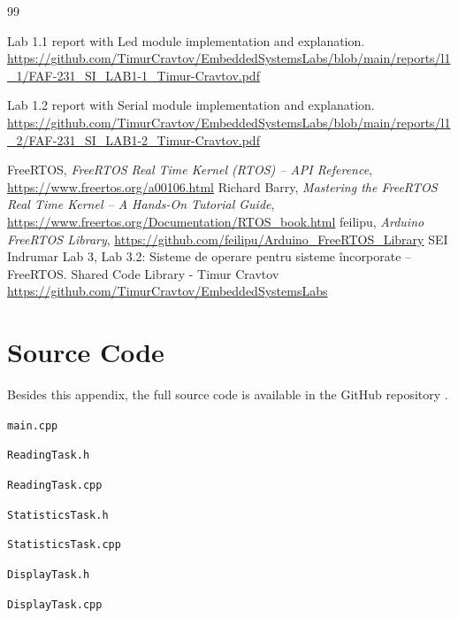 
\begin{thebibliography}{99}

 Lab 1.1 report with Led module implementation and explanation. \url{https://github.com/TimurCravtov/EmbeddedSystemsLabs/blob/main/reports/l1_1/FAF-231_SI_LAB1-1_Timur-Cravtov.pdf}

 Lab 1.2 report with Serial module implementation and explanation. \url{https://github.com/TimurCravtov/EmbeddedSystemsLabs/blob/main/reports/l1_2/FAF-231_SI_LAB1-2_Timur-Cravtov.pdf}

 FreeRTOS, \textit{FreeRTOS Real Time Kernel (RTOS) -- API Reference}, \url{https://www.freertos.org/a00106.html}
 Richard Barry, \textit{Mastering the FreeRTOS Real Time Kernel -- A Hands-On Tutorial Guide}, \url{https://www.freertos.org/Documentation/RTOS_book.html}
 feilipu, \textit{Arduino FreeRTOS Library}, \url{https://github.com/feilipu/Arduino_FreeRTOS_Library}
 SEI Indrumar Lab 3, Lab 3.2: Sisteme de operare pentru sisteme încorporate -- FreeRTOS.
 Shared Code Library - Timur Cravtov \url{https://github.com/TimurCravtov/EmbeddedSystemsLabs}
\end{thebibliography}

\appendix

\section{Source Code}

Besides this appendix, the full source code is available in the GitHub repository \cite{github}.

\texttt{main.cpp}


\texttt{ReadingTask.h}


\texttt{ReadingTask.cpp}


\texttt{StatisticsTask.h}


\texttt{StatisticsTask.cpp}


\texttt{DisplayTask.h}


\texttt{DisplayTask.cpp}
